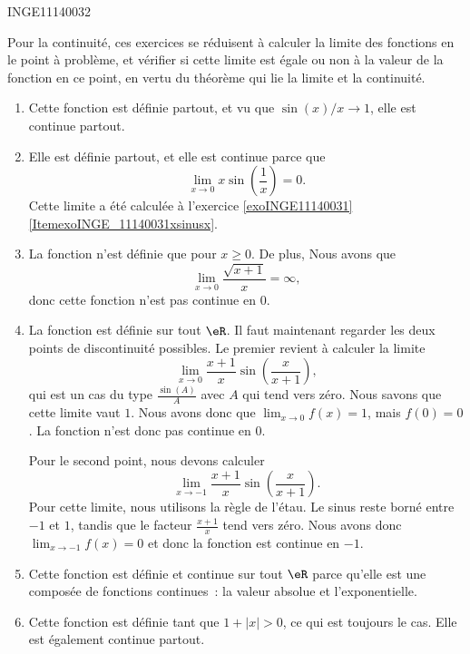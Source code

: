 \documentclass{article}
\begin{document}
\begin{corrige}{INGE11140032}

	Pour la continuité, ces exercices se réduisent à calculer la limite des fonctions en le point à problème, et vérifier si cette limite est égale ou non à la valeur de la fonction en ce point, en vertu du théorème qui lie la limite et la continuité.

	\begin{enumerate}

		\item
			Cette fonction est définie partout, et vu que $\sin(x)/x\to 1$, elle est continue partout.
		\item
			Elle est définie partout, et elle est continue parce que 
			\begin{equation}
				\lim_{x\to 0} x\sin(\frac{1}{ x })=0.
			\end{equation}
			Cette limite a été calculée à l'exercice \ref{exoINGE11140031}\ref{ItemexoINGE_11140031xsinusx}.
		\item
			La fonction n'est définie que pour $x\geq 0$. De plus,
			Nous avons que 
			\begin{equation}
				\lim_{x\to 0} \frac{ \sqrt{x+1} }{ x }=\infty,
			\end{equation}
			donc cette fonction n'est pas continue en $0$. 

		\item
			La fonction est définie sur tout $\eR$. Il faut maintenant regarder les deux points de discontinuité possibles. Le premier revient à calculer la limite
			\begin{equation}
				\lim_{x\to 0} \frac{ x+1 }{ x }\sin\left( \frac{ x }{ x+1 } \right),
			\end{equation}
			qui est un cas du type $\frac{ \sin(A) }{ A }$ avec $A$ qui tend vers zéro. Nous savons que cette limite vaut $1$. Nous avons donc que $\lim_{x\to 0} f(x)=1$, mais $f(0)=0$. La fonction n'est donc pas continue en $0$.

			Pour le second point, nous devons calculer
			\begin{equation}
				\lim_{x\to -1} \frac{ x+1 }{ x }\sin\left( \frac{ x }{ x+1 } \right).
			\end{equation}
			Pour cette limite, nous utilisons la règle de l'étau. Le sinus reste borné entre $-1$ et $1$, tandis que le facteur $\frac{ x+1 }{ x }$ tend vers zéro. Nous avons donc $\lim_{x\to -1} f(x)=0$ et donc la fonction est continue en $-1$.

		\item
			Cette fonction est définie et continue sur tout $\eR$ parce qu'elle est une composée de fonctions continues~: la valeur absolue et l'exponentielle.

		\item
			Cette fonction est définie tant que $1+| x |>0$, ce qui est toujours le cas. Elle est également continue partout.
			
	\end{enumerate}

\end{corrige}
\end{document}
